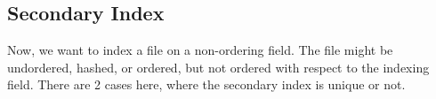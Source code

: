 \documentclass[a4paper, openany]{memoir}
\begin{document}




\subsection{Secondary Index}
Now, we want to index a file on a non-ordering field. The file might be undordered, hashed, or ordered, but not ordered with respect to the indexing field. There are 2 cases here, where the secondary index is unique or not.
\end{document}
